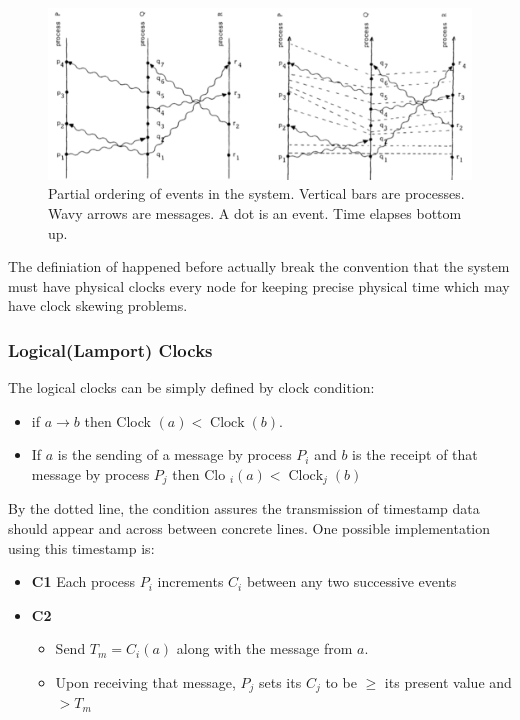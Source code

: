\documentclass[acmlarge]{acmart}
\begin{document}
\begin{figure}[h]
  \centering
  \includegraphics[width=\linewidth]{partial_order.png}
  \caption{Partial ordering of events in the system. Vertical bars are processes.
    Wavy arrows are messages. A dot is an event. Time elapses bottom up.}
\end{figure}

The definiation of happened before actually break the convention that the
system must have physical clocks every node for keeping precise physical
time which may have clock skewing problems.

\subsubsection{Logical(Lamport) Clocks}
The logical clocks can be simply defined by clock condition:
\begin{itemize}
  \item if $a \rightarrow b$ then Clock $(a)<\operatorname{Clock}(b)$.
  \item If $a$ is the sending of a message by process $P_{i}$ and $b$ is the receipt
        of that message by process $P_{j}$ then Clo ${ }_{i}(a)<\operatorname{Clock}_{j}(b)$
\end{itemize}
By the dotted line, the condition assures the transmission of timestamp data should appear and across between concrete lines. One possible
implementation using this timestamp is:

\begin{itemize}
  \item \textbf{C1} Each process $P_{i}$ increments $C_{i}$ between any two successive events
  \item \textbf{C2} \begin{itemize}
          \item Send $T_{m}=C_{i}(a)$ along with the message from $a$.
          \item Upon receiving that message, $P_{j}$ sets its $C_{j}$ to be $\geq$ its present value and $>T_{m}$
        \end{itemize}
\end{itemize}
\end{document}
